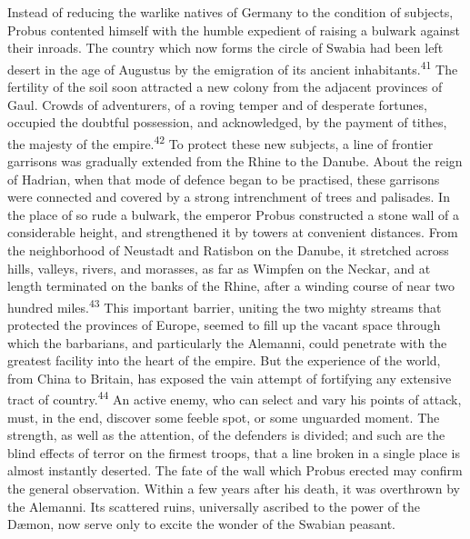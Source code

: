 Instead of reducing the warlike natives of Germany to the
condition of subjects, Probus contented himself with the humble
expedient of raising a bulwark against their inroads. The country
which now forms the circle of Swabia had been left desert in the
age of Augustus by the emigration of its ancient inhabitants.\textsuperscript{41}
The fertility of the soil soon attracted a new colony from the
adjacent provinces of Gaul. Crowds of adventurers, of a roving
temper and of desperate fortunes, occupied the doubtful
possession, and acknowledged, by the payment of tithes, the
majesty of the empire.\textsuperscript{42} To protect these new subjects, a line
of frontier garrisons was gradually extended from the Rhine to
the Danube. About the reign of Hadrian, when that mode of defence
began to be practised, these garrisons were connected and covered
by a strong intrenchment of trees and palisades. In the place of
so rude a bulwark, the emperor Probus constructed a stone wall of
a considerable height, and strengthened it by towers at
convenient distances. From the neighborhood of Neustadt and
Ratisbon on the Danube, it stretched across hills, valleys,
rivers, and morasses, as far as Wimpfen on the Neckar, and at
length terminated on the banks of the Rhine, after a winding
course of near two hundred miles.\textsuperscript{43} This important barrier,
uniting the two mighty streams that protected the provinces of
Europe, seemed to fill up the vacant space through which the
barbarians, and particularly the Alemanni, could penetrate with
the greatest facility into the heart of the empire. But the
experience of the world, from China to Britain, has exposed the
vain attempt of fortifying any extensive tract of country.\textsuperscript{44} An
active enemy, who can select and vary his points of attack, must,
in the end, discover some feeble spot, or some unguarded moment.
The strength, as well as the attention, of the defenders is
divided; and such are the blind effects of terror on the firmest
troops, that a line broken in a single place is almost instantly
deserted. The fate of the wall which Probus erected may confirm
the general observation. Within a few years after his death, it
was overthrown by the Alemanni. Its scattered ruins, universally
ascribed to the power of the Dæmon, now serve only to excite the
wonder of the Swabian peasant.


